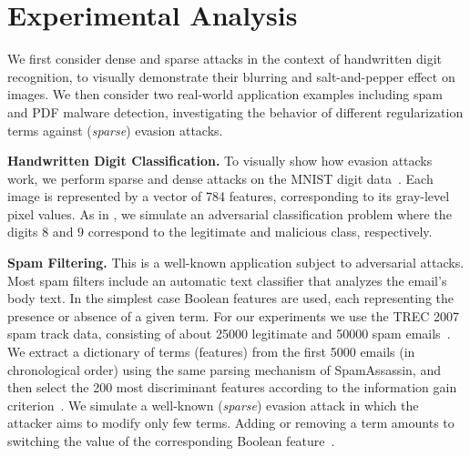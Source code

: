 \documentclass[runningheads,a4paper]{llncs}
\newcommand{\myparagraph}[1]{\smallskip \noindent \textbf{#1.}}
\begin{document}
\section{Experimental Analysis}
\label{sect:experiment}

We first consider dense and sparse attacks in the context of handwritten digit recognition, to visually demonstrate their blurring and salt-and-pepper effect on images.
We then consider two real-world application examples including spam and PDF malware detection, investigating the behavior of different regularization terms against (\emph{sparse}) evasion attacks.

\myparagraph{Handwritten Digit Classification}
To visually show how evasion attacks work, we perform sparse and dense attacks on the MNIST digit data~\cite{LeCun95}. Each image is represented by a vector of 784 features, corresponding to its gray-level pixel values.
As in \cite{biggio13-ecml}, we simulate an adversarial classification problem where the digits $8$ and $9$ correspond to the legitimate and malicious class, respectively.


\myparagraph{Spam Filtering}
This is a well-known application subject to adversarial attacks.
Most spam filters include an automatic text classifier that analyzes the email's body text. In the simplest case Boolean features are used, each representing the presence or absence of a given term.
For our experiments we use the TREC 2007 spam track data, consisting of about 25000 legitimate and 50000 spam emails~\cite{trec07}.
We extract a dictionary of terms (features) from the first 5000 emails (in chronological order) using the same parsing mechanism of SpamAssassin, and then select the 200 most discriminant features according to the information gain criterion~\cite{sebastiani02}.
We simulate a well-known (\emph{sparse}) evasion attack in which the attacker aims to modify only few terms. Adding or removing a term amounts to switching the value of the corresponding Boolean feature~\cite{lowd05-ceas,kolcz09,biggio13-ecml,biggio14-tkde,zhang16-tcyb}.
\end{document}
